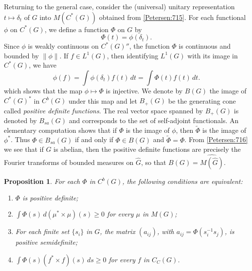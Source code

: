 \documentclass{book}
\newtheorem{proposition}[definition]{Proposition}
\begin{document}
Returning to the general case, consider the (universal) unitary representation
\(t\mapsto\delta_t\) of \(G\) into \(M(C^*(G))\) obtained from \ref{Petersen:715}. For each functional \(\phi\) on
\(C^*(G)\), we define a function \(\Phi\) on \(G\) by 
\begin{equation}\label{Petersen:718}
  \Phi(t)=\phi(\delta_t).
\end{equation}
Since \(\phi\) is weakly continuous on \(C^*(G)''\), the function \(\Phi\) is continuous and bounded by \(\|\phi\|\).
If \(f\in L^1(G)\), then identifying \(L^1(G)\) with its image in \(C^*(G)\), we have
\[
  \phi(f)=\int\phi(\delta_t)f(t)\,dt=\int\Phi(t)f(t)\,dt.
\]
which shows that the map \(\phi\mapsto\Phi\) is injective. We denote by \(B(G)\) the image
of \(C^*(G)^*\) in \(C^b(G)\) under this map and let \(B_+(G)\) be the generating cone called \textit{positive definite functions}.
The real vector space spanned by \(B_+(G)\) is denoted by \(B_{sa}(G)\) and corresponds to the set of self-adjoint functionals.
An elementary computation shows that if \(\Phi\) is the image of \(\phi\), then \(\tilde{\Phi}\) is the image of \(\phi^*\).
Thus \(\Phi\in B_{sa}(G)\) if and only if \(\Phi\in B(G)\) and \(\tilde{\Phi}=\Phi\).
From \ref{Petersen:716} we see that if \(G\) is abelian, then the positive definite functions are precisely the Fourier transforms of 
bounded measures on \(\hat{G}\), so that \(B(G)=\hat{M(\hat{G})}\).
\begin{proposition}\label{Petersen:719}
  For each \(\Phi\) in \(C^b(G)\), the following conditions are equivalent:
  \begin{enumerate}
    \item \(\Phi\) is positive definite;
    \item \(\int\Phi(s)\,d(\mu^*\times\mu)(s)\geq 0\) for every \(\mu\) in \(M(G)\);
    \item For each finite set \(\{s_i\}\) in \(G\), the matrix \((a_{ij})\), with \(a_{ij}=\Phi(s^{-1}_i s_j)\), is positive semidefinite;
    \item \(\int\Phi(s)(f^*\times f)(s)\,ds\geq 0\) for every \(f\) in \(C_C(G)\).
  \end{enumerate}
\end{proposition}
\end{document}
